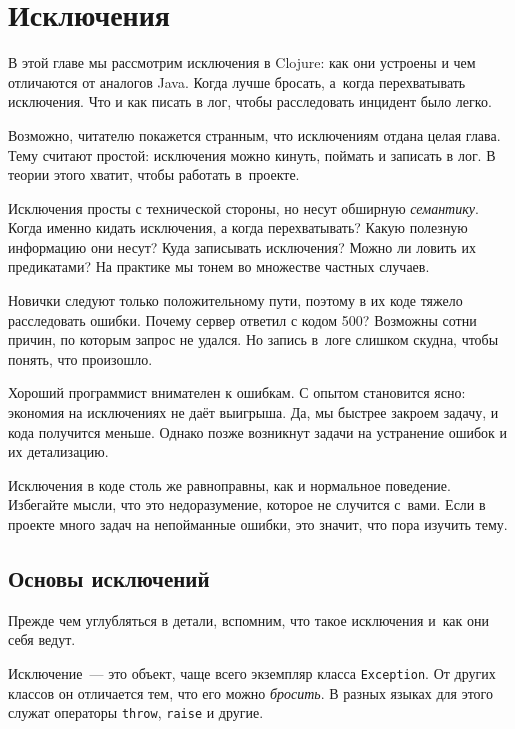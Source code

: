 \chapter{Исключения}


\begin{teaser}
В этой главе мы рассмотрим исключения в Clojure: как они устроены и чем
отличаются от аналогов Java. Когда лучше бросать, а~когда перехватывать
исключения. Что и как писать в лог, чтобы расследовать инцидент было легко.
\end{teaser}

Возможно, читателю покажется странным, что исключениям отдана целая глава. Тему
считают простой: исключения можно кинуть, поймать и записать в лог. В теории
этого хватит, чтобы работать в~проекте.

Исключения просты с технической стороны, но несут обширную
\emph{семантику}. Когда именно кидать исключения, а когда перехватывать?  Какую
полезную информацию они несут? Куда записывать исключения? Можно ли ловить их
предикатами? На практике мы тонем во множестве частных случаев.

Новички следуют только положительному пути, поэтому в их коде тяжело
расследовать ошибки. Почему сервер ответил с кодом 500? Возможны сотни причин,
по которым запрос не удался. Но запись в~логе слишком скудна, чтобы понять, что
произошло.

Хороший программист внимателен к ошибкам. С опытом становится ясно: экономия на
исключениях не даёт выигрыша. Да, мы быстрее закроем задачу, и кода
получится меньше. Однако позже возникнут задачи на устранение ошибок и их
детализацию.

Исключения в коде столь же равноправны, как и нормальное поведение. Избегайте
мысли, что это недоразумение, которое не случится с~вами. Если в проекте много
задач на непойманные ошибки, это значит, что пора изучить тему.

\section{Основы исключений}


Прежде чем углубляться в детали, вспомним, что такое исключения и~как они себя
ведут.

Исключение~--- это объект, чаще всего экземпляр класса \verb|Exception|. От других
классов он отличается тем, что его можно \emph{бросить}. В разных языках для
этого служат операторы \verb|throw|, \verb|raise| и другие.

